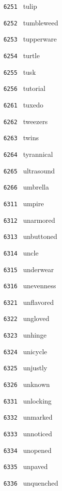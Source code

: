 \documentclass[11pt]{article}
\begin{document}
\begin{multicols}{6}
\vspace{3mm}
\noindent \texttt{ 6251 } tulip  \par
\noindent \texttt{ 6252 } tumbleweed  \par
\noindent \texttt{ 6253 } tupperware  \par
\noindent \texttt{ 6254 } turtle  \par
\noindent \texttt{ 6255 } tusk  \par
\noindent \texttt{ 6256 } tutorial  \par
\vspace{3mm}
\noindent \texttt{ 6261 } tuxedo  \par
\noindent \texttt{ 6262 } tweezers  \par
\noindent \texttt{ 6263 } twins  \par
\noindent \texttt{ 6264 } tyrannical  \par
\noindent \texttt{ 6265 } ultrasound  \par
\noindent \texttt{ 6266 } umbrella  \par
\noindent \texttt{ 6311 } umpire  \par
\noindent \texttt{ 6312 } unarmored  \par
\noindent \texttt{ 6313 } unbuttoned  \par
\noindent \texttt{ 6314 } uncle  \par
\noindent \texttt{ 6315 } underwear  \par
\noindent \texttt{ 6316 } unevenness  \par
\vspace{3mm}
\noindent \texttt{ 6321 } unflavored  \par
\noindent \texttt{ 6322 } ungloved  \par
\noindent \texttt{ 6323 } unhinge  \par
\noindent \texttt{ 6324 } unicycle  \par
\noindent \texttt{ 6325 } unjustly  \par
\noindent \texttt{ 6326 } unknown  \par
\vspace{3mm}
\noindent \texttt{ 6331 } unlocking  \par
\noindent \texttt{ 6332 } unmarked  \par
\noindent \texttt{ 6333 } unnoticed  \par
\noindent \texttt{ 6334 } unopened  \par
\noindent \texttt{ 6335 } unpaved  \par
\noindent \texttt{ 6336 } unquenched  \par

\end{multicols}
\end{document}

